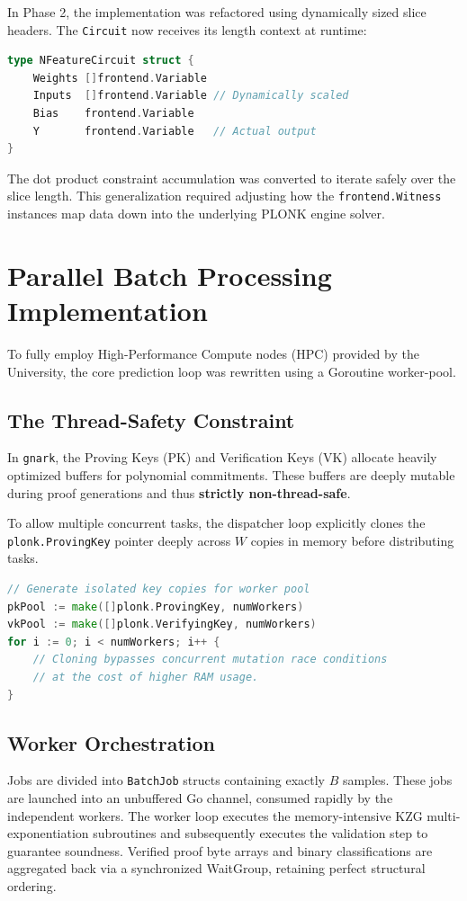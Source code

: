 In Phase 2, the implementation was refactored using dynamically sized slice headers. The \texttt{Circuit} now receives its length context at runtime:
\begin{lstlisting}[language=Go]
type NFeatureCircuit struct {
    Weights []frontend.Variable
    Inputs  []frontend.Variable // Dynamically scaled
    Bias    frontend.Variable
    Y       frontend.Variable   // Actual output
}
\end{lstlisting}
The dot product constraint accumulation was converted to iterate safely over the slice length. This generalization required adjusting how the \texttt{frontend.Witness} instances map data down into the underlying PLONK engine solver.

\section{Parallel Batch Processing Implementation}

To fully employ High-Performance Compute nodes (HPC) provided by the University, the core prediction loop was rewritten using a Goroutine worker-pool.

\subsection{The Thread-Safety Constraint}
In \texttt{gnark}, the Proving Keys (PK) and Verification Keys (VK) allocate heavily optimized buffers for polynomial commitments. These buffers are deeply mutable during proof generations and thus \textbf{strictly non-thread-safe}. 

To allow multiple concurrent tasks, the dispatcher loop explicitly clones the \texttt{plonk.ProvingKey} pointer deeply across $W$ copies in memory before distributing tasks.
\begin{lstlisting}[language=Go]
// Generate isolated key copies for worker pool
pkPool := make([]plonk.ProvingKey, numWorkers)
vkPool := make([]plonk.VerifyingKey, numWorkers)
for i := 0; i < numWorkers; i++ {
    // Cloning bypasses concurrent mutation race conditions
    // at the cost of higher RAM usage.
}
\end{lstlisting}

\subsection{Worker Orchestration}
Jobs are divided into \texttt{BatchJob} structs containing exactly $B$ samples. These jobs are launched into an unbuffered Go channel, consumed rapidly by the independent workers. The worker loop executes the memory-intensive KZG multi-exponentiation subroutines and subsequently executes the validation step to guarantee soundness. Verified proof byte arrays and binary classifications are aggregated back via a synchronized WaitGroup, retaining perfect structural ordering.

